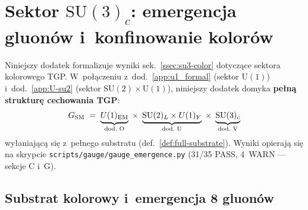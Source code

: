 \section{Sektor $\mathrm{SU}(3)_c$: emergencja gluon\'ow
  i~konfinowanie kolor\'ow}%
\label{app:V-su3}

Niniejszy dodatek formalizuje wyniki sek.~\ref{ssec:su3-color}
dotycz\k{a}ce sektora kolorowego TGP.
W~po\l\k{a}czeniu z~dod.~\ref{app:u1_formal}
(sektor $\mathrm{U}(1)$) i~dod.~\ref{app:U-su2} (sektor
$\mathrm{SU}(2)\times\mathrm{U}(1)$), niniejszy dodatek
domyka \textbf{pe\l{}n\k{a} struktur\k{e} cechowania TGP}:
\begin{equation}\label{eq:V-gauge-group}
  G_{\rm SM} \;=\;
  \underbrace{U(1)_{\mathrm{EM}}}_{\text{dod.~O}}
  \;\times\;
  \underbrace{\mathrm{SU}(2)_L\times U(1)_Y}_{\text{dod.~U}}
  \;\times\;
  \underbrace{\mathrm{SU}(3)_c}_{\text{dod.~V}}
\end{equation}
wyłaniaj\k{a}c\k{a} si\k{e} z~pe\l{}nego substratu
(def.~\ref{def:full-substrate}).
Wyniki opieraj\k{a} si\k{e} na skrypcie
\texttt{scripts/gauge/gauge\_emergence.py}
(31/35 PASS, 4~WARN --- sekcje C i~G).

\medskip
\noindent{}
\medskip

\subsection{Substrat kolorowy i~emergencja 8 gluon\'ow}%
\label{app:V-emergence}

